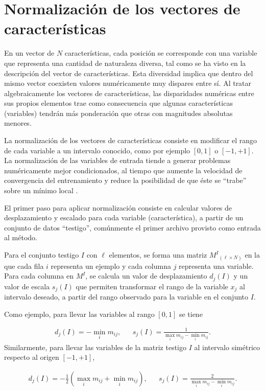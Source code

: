 \section{Normalización de los vectores de características}
En un vector de $N$ características, cada posición se corresponde con
una variable que representa una cantidad de naturaleza diversa, tal
como se ha visto en la descripción del vector de características. Esta
diversidad implica que dentro del mismo vector coexisten valores
numéricamente muy dispares entre sí. Al tratar algebraicamente los
vectores de características, las disparidades numéricas entre sus
propios elementos trae como consecuencia que algunas características
(variables) tendrán más ponderación que otras con magnitudes absolutas
menores.

La normalización de los vectores de características consiste en
modificar el rango de cada variable a un intervalo conocido, como por
ejemplo $[0,1]$ o $[-1,+1]$.  La normalización de las variables de
entrada tiende a generar problemas numéricamente mejor condicionados,
al tiempo que aumente la velocidad de convergencia del entrenamiento y
reduce la posibilidad de que éste se ``trabe'' sobre un mínimo local
\cite{nnfaq2}.

El primer paso para aplicar normalización consiste en calcular valores
de desplazamiento y escalado para cada variable (característica), a
partir de un conjunto de datos ``testigo'', comúnmente el primer
archivo provisto como entrada al método.

Para el conjunto testigo $I$ con $\ell$ elementos, se forma una matriz
$M^I{}_{(\ell\times N)}$ en la que cada fila $i$ representa un ejemplo
y cada columna $j$ representa una variable.  Para cada columna en
$M^I$, se calcula un valor de desplazamiento $d_j(I)$ y un valor de
escala $s_j(I)$ que permiten transformar el rango de la variable $x_j$
al intervalo deseado, a partir del rango observado para la variable en
el conjunto $I$.

Como ejemplo, para llevar las variables al rango $[0,1]$ se tiene

\begin{align}
  d_j(I) = - \min_i m_{ij}, && s_j(I) = \frac{1}{\max_i m_{ij} - \min_i m_{ij}}.
\end{align}
Similarmente, para llevar las variables de la matriz testigo $I$
al intervalo simétrico respecto al origen $[-1,+1]$,

\begin{align}
  d_j(I) = - \frac{1}{2} \left(\max_i m_{ij} + \min_i m_{ij}\right), &&
  s_j(I) = \frac{2}{\max_i m_{ij} - \min_i m_{ij}}.
\end{align}

